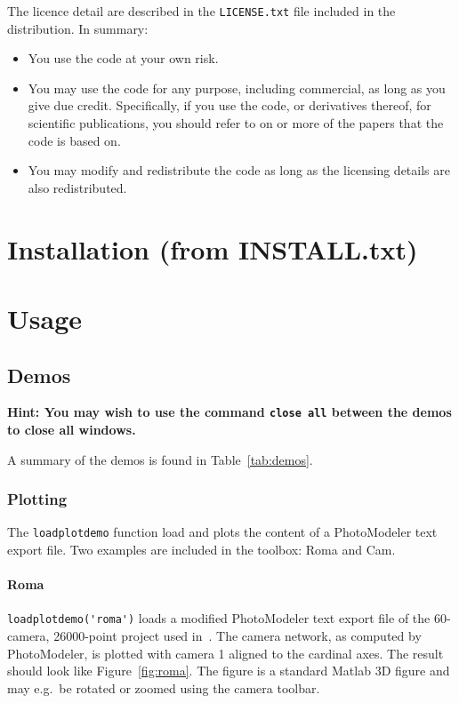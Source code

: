 \documentclass{article}
\begin{document}
The licence detail are described in the \texttt{LICENSE.txt} file
included in the distribution. In summary:
\begin{itemize}
\item You use the code at your own risk.
\item You may use the code for any purpose, including commercial, as
  long as you give due credit. Specifically, if you use the code, or
  derivatives thereof, for scientific publications, you should refer
  to on or more of the papers
  \citet{Borlin2013:Bundle,Borlin2013:Experiments,Borlin2014:Camera,
    Borlin2016:External,Borlin2018:Modular,Borlin2019:Implementing,
    Borlin2019:Flexible}
  that the code is based on.
\item You may modify and redistribute the code as long as the
  licensing details are also redistributed.
\end{itemize}

\newpage
\section[Installation]{Installation (from INSTALL.txt)}
\label{sec:install}
\label{step:dbatInit}

{\footnotesize

}

\newpage
\section{Usage}

\subsection{Demos}
\label{sec:demos}

\textbf{Hint: You may wish to use the command \texttt{close all}
  between the demos to close all windows.}

A summary of the demos is found in Table~\ref{tab:demos}.

\subsubsection{Plotting}
\label{sec:loadplotdemo}
\label{sec:loadroma}

The \verb+loadplotdemo+ function load and plots the content of a
PhotoModeler text export file. Two examples are included in the
toolbox: {\sc Roma} and {\sc Cam}.

\paragraph{\sc Roma}
\verb+loadplotdemo('roma')+ loads a modified PhotoModeler text export
file of the 60-camera, 26000-point project used
in~\citet{Borlin2013:Bundle}. The camera network, as computed by
PhotoModeler, is plotted with camera 1 aligned to the cardinal axes.
The result should look like Figure~\ref{fig:roma}. The figure is a
standard Matlab 3D figure and may e.g.\ be rotated or zoomed using the
camera toolbar.
\end{document}
